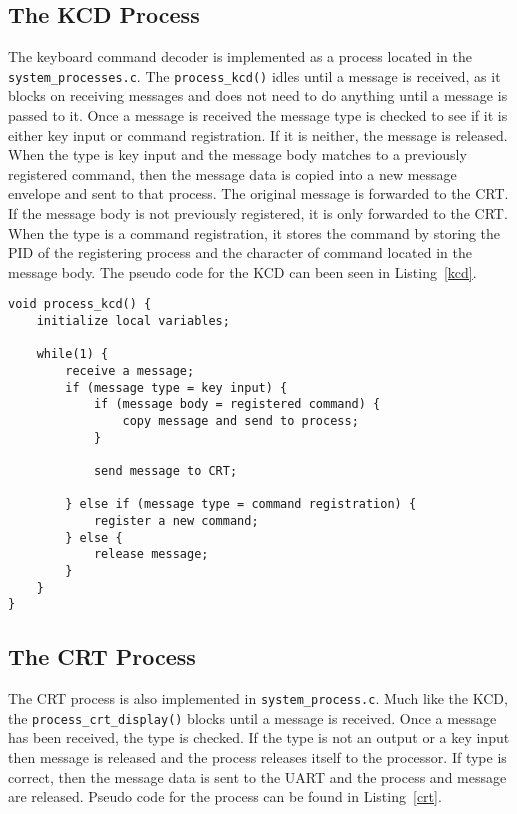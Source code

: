 \documentclass[oneside]{article}
\begin{document}
\subsection*{The KCD Process}
The keyboard command decoder is implemented as a process located in the
\texttt{system\_proc\-esses.c}. The \texttt{process\_kcd()} idles until a message
is received, as it blocks on receiving messages and does not need to do
anything until a message is passed to it. Once a message is received the
message type is checked to see if it is either key input or command
registration. If it is neither, the message is released. When the type is key
input and the message body matches to a previously registered command, then the
message data is copied into a new message envelope and sent to that process. The 
original message is forwarded to the CRT. If the message body is not
previously registered, it is only forwarded to the CRT. When the type is a
command registration, it stores the command by storing the PID of the
registering process and the character of command located in the message body.
The pseudo code for the KCD can been seen in Listing~\ref{kcd}. 

\begin{lstlisting}
void process_kcd() {
    initialize local variables;

    while(1) {
        receive a message;
        if (message type = key input) {
            if (message body = registered command) {
                copy message and send to process;
            }
        
            send message to CRT;    

        } else if (message type = command registration) {
            register a new command;
        } else {
            release message;
        }
    }
}
\end{lstlisting}

\subsection*{The CRT Process}
The CRT process is also implemented in \texttt{system\_process.c}. Much like
the KCD, the \texttt{process\_crt\_display()} blocks until a message is
received. Once a message has been received, the type is checked. If the type is
not an output or a key input then message is released and the process releases
itself to the processor. If type is correct, then the message data is sent to
the UART and the process and message are released. Pseudo code for the process
can be found in Listing~\ref{crt}.
\end{document}
